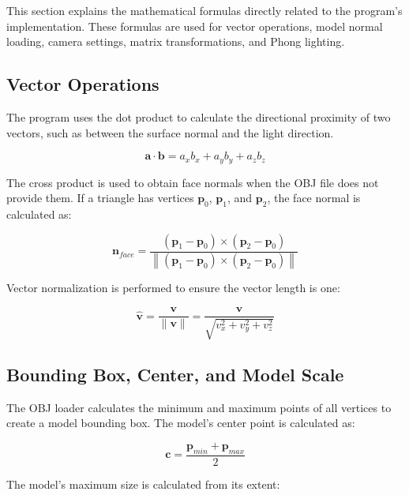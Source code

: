 \documentclass[12pt,a4paper]{article}
\begin{document}
This section explains the mathematical formulas directly related to the
program's implementation. These formulas are used for vector operations,
model normal loading, camera settings, matrix transformations, and Phong lighting.

\subsection{Vector Operations}

The program uses the dot product to calculate the directional proximity of two vectors,
such as between the surface normal and the light direction.

\begin{equation}
    \mathbf{a} \cdot \mathbf{b}
    =
    a_x b_x + a_y b_y + a_z b_z
\end{equation}

The cross product is used to obtain face normals when the OBJ file does not
provide them. If a triangle has vertices $\mathbf{p}_0$, $\mathbf{p}_1$, and $\mathbf{p}_2$,
the face normal is calculated as:

\begin{equation}
    \mathbf{n}_{face}
    =
    \frac{(\mathbf{p}_1 - \mathbf{p}_0) \times
    (\mathbf{p}_2 - \mathbf{p}_0)}
    {\left\|(\mathbf{p}_1 - \mathbf{p}_0) \times
    (\mathbf{p}_2 - \mathbf{p}_0)\right\|}
\end{equation}

Vector normalization is performed to ensure the vector length is one:

\begin{equation}
    \hat{\mathbf{v}}
    =
    \frac{\mathbf{v}}{\|\mathbf{v}\|}
    =
    \frac{\mathbf{v}}{\sqrt{v_x^2 + v_y^2 + v_z^2}}
\end{equation}

\subsection{Bounding Box, Center, and Model Scale}

The OBJ loader calculates the minimum and maximum points of all vertices to
create a model bounding box. The model's center point is calculated as:

\begin{equation}
    \mathbf{c}
    =
    \frac{\mathbf{p}_{min} + \mathbf{p}_{max}}{2}
\end{equation}

The model's maximum size is calculated from its extent:
\end{document}
